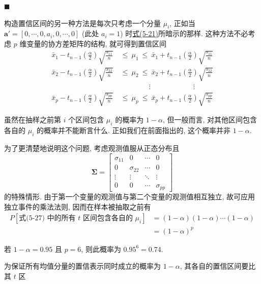\begin{mvfigure}
\label{fig:5.3}
\end{mvfigure}
\hfill$\blacksquare$


构造置信区间的另一种方法是每次只考虑一个分量 $\mu_{i}$, 正如当 $\mathbf{a}'=[0,\cdots,0,a_{i},0,\cdots,0]$ (此处 $a_{i}=1$) 时\hyperref[eq:5-21]{式(5-21)}所暗示的那样. 这种方法不必考虑 $p$ 维变量的协方差矩阵的结构, 就可得到置信区间
\label{eq:5-27}
\begin{equation}
\begin{aligned}
\bar{x}_{1}-t_{n-1}\left(\frac{\alpha}{2}\right)\sqrt{\frac{s_{11}}{n}}\ &\le\ \mu_{1}\ \le\ \bar{x}_{1}+t_{n-1}\left(\frac{\alpha}{2}\right)\sqrt{\frac{s_{11}}{n}}\\
\bar{x}_{2}-t_{n-1}\left(\frac{\alpha}{2}\right)\sqrt{\frac{s_{22}}{n}}\ &\le\ \mu_{2}\ \le\ \bar{x}_{2}+t_{n-1}\left(\frac{\alpha}{2}\right)\sqrt{\frac{s_{22}}{n}}\\
&\qquad\qquad\vdots\qquad\qquad\qquad\vdots\\
\bar{x}_{p}-t_{n-1}\left(\frac{\alpha}{2}\right)\sqrt{\frac{s_{pp}}{n}}\ &\le\ \mu_{p}\ \le\ \bar{x}_{p}+t_{n-1}\left(\frac{\alpha}{2}\right)\sqrt{\frac{s_{pp}}{n}}
\end{aligned} \tag{5-27}
\end{equation}

虽然在抽样之前第 $i$ 个区间包含 $\mu_{i}$ 的概率为 $1-\alpha$, 但一般而言, 对其他区间包含各自的 $\mu_{i}$ 的概率并不能断言什么. 正如我们在前面指出的, 这个概率并非 $1-\alpha$.

为了更清楚地说明这个问题, 考虑观测值服从正态分布且
\[
\boldsymbol{\Sigma}=\begin{bmatrix}\sigma_{11}&0&\cdots&0\\0&\sigma_{22}&\cdots&0\\\vdots&\vdots&\ddots&\vdots\\0&0&\cdots&\sigma_{pp}\end{bmatrix}
\]
的特殊情形. 由于第一个变量的观测值与第二个变量的观测值相互独立, 故可应用独立事件的乘法法则, 因而在样本被抽取之前有
\[
\begin{aligned}
P[\text{式(5-27) 中的所有 }t\text{ 区间包含各自的 }\mu_{i}]&=(1-\alpha)(1-\alpha)\cdots(1-\alpha)\\
&=(1-\alpha)^{p}
\end{aligned}
\]

若 $1-\alpha=0.95$ 且 $p=6$, 则此概率为 $0.95^{6}=0.74$.

为保证所有均值分量的置信表示同时成立的概率为 $1-\alpha$, 其各自的置信区间要比其 $t$ 区

